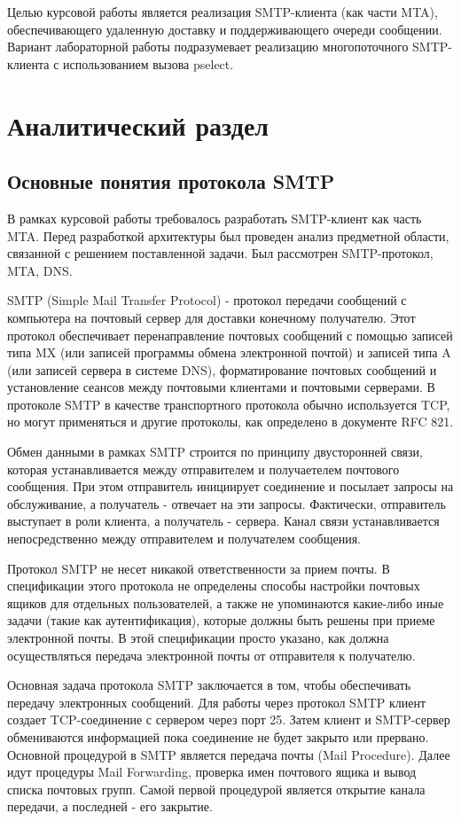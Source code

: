 \documentclass[a4paper,12pt]{report}
\begin{document}
	Целью курсовой работы является реализация SMTP-клиента (как части MTA), обеспечивающего удаленную доставку и поддерживающего очереди сообщении. Вариант лабораторной работы подразумевает реализацию многопоточного SMTP-клиента с использованием вызова pselect.

	\chapter{Аналитический раздел}
	\section{Основные понятия протокола SMTP}
	В рамках курсовой работы требовалось разработать SMTP-клиент как часть MTA. Перед разработкой архитектуры был проведен анализ предметной области, связанной с решением поставленной задачи. Был рассмотрен SMTP-протокол, MTA, DNS.

	SMTP (Simple Mail Transfer Protocol) - протокол передачи сообщений с компьютера на почтовый сервер для доставки конечному получателю. Этот протокол обеспечивает перенаправление почтовых сообщений с помощью записей типа MX (или записей программы обмена электронной почтой) и записей типа A (или записей сервера в системе DNS), форматирование почтовых сообщений и установление сеансов между почтовыми клиентами и почтовыми серверами. В протоколе SMTP в качестве транспортного протокола обычно используется TCP, но могут применяться и другие протоколы, как определено в документе RFC 821.

	Обмен данными в рамках SMTP строится по принципу двусторонней связи, которая устанавливается между отправителем и получаетелем почтового сообщения. При этом отправитель инициирует соединение и посылает запросы на обслуживание, а получатель - отвечает на эти запросы. Фактически, отправитель выступает в роли клиента, а получатель - сервера. Канал связи устанавливается непосредственно между отправителем и получателем сообщения.

	Протокол SMTP не несет никакой ответственности за прием почты. В спецификации этого протокола не определены способы настройки почтовых ящиков для отдельных пользователей, а также не упоминаются какие-либо иные задачи (такие как аутентификация), которые должны быть решены при приеме электронной почты. В этой спецификации просто указано, как должна осуществляться передача электронной почты от отправителя к получателю.

	Основная задача протокола SMTP заключается в том, чтобы обеспечивать передачу электронных сообщений. Для работы через протокол SMTP клиент создает TCP-соединение с сервером через порт 25. Затем клиент и SMTP-сервер обмениваются информацией пока соединение не будет закрыто или прервано. Основной процедурой в SMTP является передача почты (Mail Procedure). Далее идут процедуры Mail Forwarding, проверка имен почтового ящика и вывод списка почтовых групп. Самой первой процедурой является открытие канала передачи, а последней - его закрытие.
\end{document}
